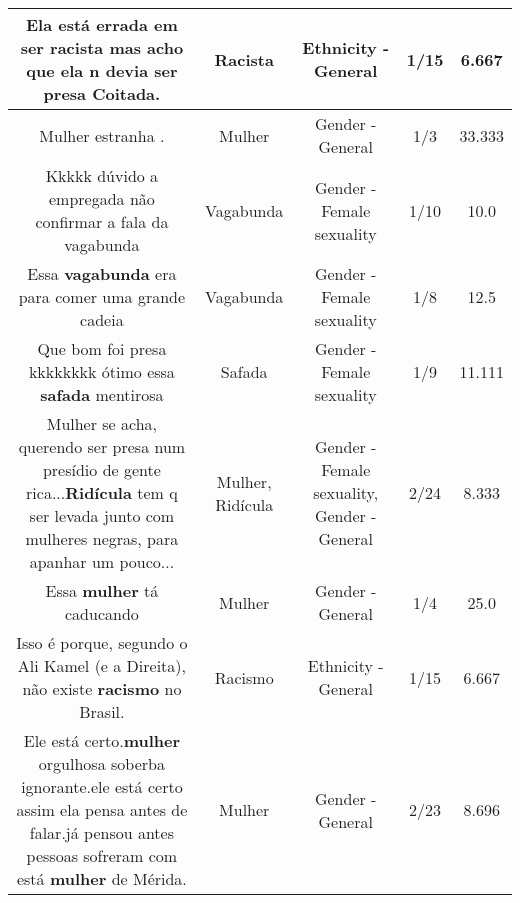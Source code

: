 \documentclass[11pt]{article}
\newlength\mylength
\begin{document}
\begin{center}
\begin{longtable}{|C{.65\mylength}|C{.30\mylength}|C{.12\mylength}|C{.12\mylength}|C{.12\mylength}|}
  \small Ela está errada em ser \textbf{racista} mas acho que ela n devia ser presa Coitada.\normalsize   & Racista & Ethnicity - General & 1/15 & 6.667 \\  \hline
  \small Mulher estranha .\normalsize   & Mulher & Gender - General & 1/3 & 33.333 \\  \hline
  \small Kkkkk dúvido a empregada não confirmar a fala da vagabunda\normalsize   & Vagabunda & Gender - Female sexuality & 1/10 & 10.0 \\  \hline
  \small Essa \textbf{vagabunda} era para comer uma grande cadeia\normalsize   & Vagabunda & Gender - Female sexuality & 1/8 & 12.5 \\  \hline
  \small Que bom foi presa kkkkkkkk ótimo essa \textbf{safada} mentirosa\normalsize   & Safada & Gender - Female sexuality & 1/9 & 11.111 \\  \hline
  \small Mulher se acha, querendo ser presa num presídio de gente rica...\textbf{Ridícula} tem q ser levada junto com mulheres negras, para apanhar um pouco...\normalsize   & Mulher, Ridícula & Gender - Female sexuality, Gender - General & 2/24 & 8.333 \\  \hline
  \small Essa \textbf{mulher} tá caducando\normalsize   & Mulher & Gender - General & 1/4 & 25.0 \\  \hline
  \small Isso é porque, segundo o Ali Kamel (e a Direita), não existe \textbf{racismo} no Brasil.\normalsize   & Racismo & Ethnicity - General & 1/15 & 6.667 \\  \hline
  \small Ele está certo.\textbf{mulher} orgulhosa soberba ignorante.ele está certo assim ela pensa antes de falar.já pensou antes pessoas sofreram com está \textbf{mulher} de Mérida.\normalsize   & Mulher & Gender - General & 2/23 & 8.696 \\  \hline

\end{longtable}
\end{center}
\end{document}
